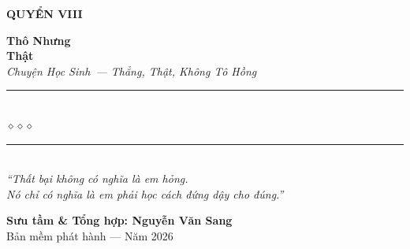 \begin{titlepage}
\begin{center}
  \begin{tcolorbox}[
    width=6.5cm,
    colback=truyengold!20,
    colframe=truyengold!80!black,
    arc=4pt,
    boxrule=1.5pt,
    halign=center
  ]
    {\fontsize{18}{22}\selectfont\bfseries\color{truyenred!80!black}
     QUYỂN VIII}
  \end{tcolorbox}
  \vspace{0.8cm}

  {\fontsize{38}{45}\selectfont\bfseries\color{truyenred!80!black}
    Thô Nhưng}\\[0.4cm]
  {\fontsize{38}{45}\selectfont\bfseries\color{truyengold!80!black}
    Thật}\\[0.4cm]

  {\fontsize{16}{20}\selectfont\color{truyengold!90!black}\itshape
    Chuyện Học Sinh~--- Thẳng, Thật, Không Tô Hồng}\\[1cm]

  {\color{truyenblue!60}\rule{6cm}{1pt}}\\[5pt]
  {\color{truyengold!80!black}\large$\diamond$\hspace{1cm}$\diamond$\hspace{1cm}$\diamond$}\\[5pt]
  {\color{truyenblue!60}\rule{6cm}{1pt}}\\[1.5cm]

  {\normalsize\itshape\color{truyenblue!90!black}
   ``Thất bại không có nghĩa là em hỏng.\\
   Nó chỉ có nghĩa là em phải học cách đứng dậy cho đúng.''}

  \vfill

  {\fontsize{16}{20}\selectfont\bfseries\color{truyenblue!90!black}
    Sưu tầm \& Tổng hợp: \textbf{Nguyễn Văn Sang}}\\[0.4cm]

  {\small\color{gray} Bản mềm phát hành --- Năm 2026}\\[0.5cm]
\end{center}

\afterpage{\nopagecolor}
\end{titlepage}